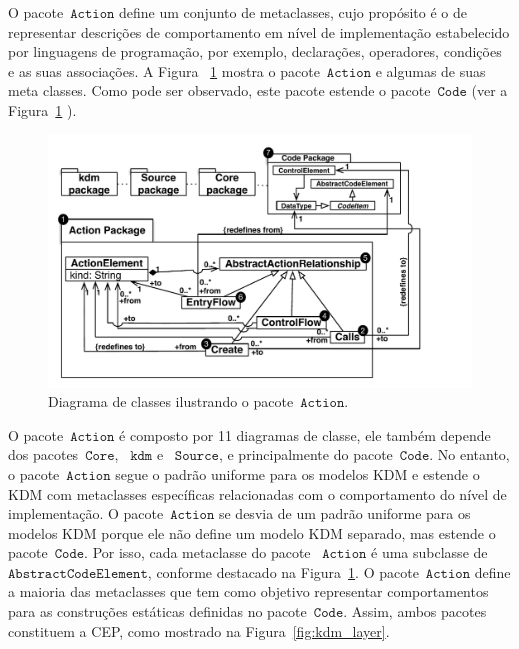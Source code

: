 O pacote~$\mathtt{Action}$ define um conjunto de metaclasses, cujo propósito é o de representar descrições de comportamento em nível de implementação estabelecido por linguagens de programação, por exemplo, declarações, operadores, condições e as suas associações. A Figura ~\ref{fig:actionModel}  mostra o pacote~$\mathtt{Action}$ e algumas de suas meta classes. Como pode ser observado, este pacote estende o pacote~$\mathtt{Code}$ (ver a Figura~\ref {fig:actionModel} ).


\begin{figure}[!ht]
	\centering
	\includegraphics[scale=0.8]{images/ActionModel_Class_Diagram}
	\caption{Diagrama de classes ilustrando o pacote~$\mathtt{Action}$.}
	\label{fig:actionModel}
\end{figure}

O pacote~$\mathtt{Action}$ é composto por 11 diagramas de classe, ele também depende dos pacotes~$\mathtt{Core}$, ~$\mathtt{kdm}$ e ~$\mathtt{Source}$, e  principalmente do pacote~$\mathtt{Code}$. No entanto, o pacote~$\mathtt{Action}$ segue o padrão uniforme para os modelos KDM e estende o KDM com metaclasses específicas relacionadas com o comportamento do nível de implementação. O pacote~$\mathtt{Action}$ se desvia de um padrão uniforme para os modelos KDM porque ele não define um modelo KDM separado, mas estende o pacote~$\mathtt{Code}$.  Por isso, cada metaclasse do pacote ~$\mathtt{Action}$ é uma subclasse de~$\mathtt{AbstractCodeElement}$, conforme destacado na Figura~\ref{fig:actionModel}. O pacote~$\mathtt{Action}$ define a maioria das metaclasses que tem como objetivo representar comportamentos para as construções estáticas definidas no pacote~$\mathtt{Code}$. Assim, ambos pacotes constituem a CEP, como mostrado na Figura~\ref{fig:kdm_layer}.

